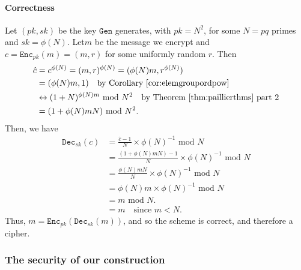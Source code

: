 \documentclass{article}
\theoremstyle{definition}
\theoremstyle{example}
\newcommand{\Enc}{\texttt{Enc}}
\newcommand{\Dec}{\texttt{Dec}}
\newcommand{\Gen}{\texttt{Gen}}
\renewcommand{\mod}{\,\,\text{mod}\,\,}
\begin{document}
\paragraph{Correctness}
Let $(pk, sk)$ be the key $\Gen$ generates, with $pk = N^2$, for some $N = pq$
primes and $sk = \phi(N)$. Let$m$ be the message we encrypt and $c =
\Enc_{pk}(m) =(m, r)$ for some uniformly random $r$. Then
\begin{align*}
  \hat{c} &= c^{\phi(N)} = (m, r)^{\phi(N)} = (\phi(N)m, r^{\phi(N)}) \\
          &= (\phi(N)m, 1) \quad \text{by Corollary \ref{cor:elemgroupordpow}}\\
          &\leftrightarrow (1 + N)^{\phi(N)m} \mod N^2 \quad \text{by Theorem \ref{thm:paillierthms} part 2}\\
          &= (1 + \phi(N)mN) \mod N^2.
\end{align*}
Then, we have
\begin{align*}
  \Dec_{sk}(c) &= \frac{\hat{c} - 1}{N} \times \phi(N)^{-1} \mod N\\
               &= \frac{(1 + \phi(N)mN) - 1}{N} \times \phi(N)^{-1} \mod N\\
               &= \frac{\phi(N)mN}{N}\times \phi(N)^{-1} \mod N\\
               &= \phi(N)m \times \phi(N)^{-1} \mod N \\
               &= m \mod N. \\
               &= m \quad \text{since } m < N.
\end{align*}
Thus, $m = \Enc_{pk}(\Dec_{sk}(m))$, and so the scheme is correct, and therefore
a cipher.
\subsubsection{The security of our construction}
\end{document}
